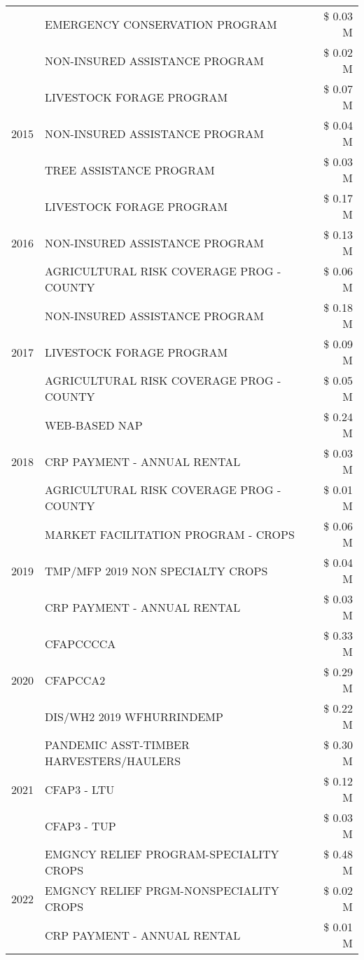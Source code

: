 \begin{tabular}{llr}
 & EMERGENCY CONSERVATION PROGRAM & \$ 0.03 M \\
 & NON-INSURED ASSISTANCE PROGRAM & \$ 0.02 M \\
\cline{1-3}
\multirow[t]{3}{*}{2015} & LIVESTOCK FORAGE PROGRAM & \$ 0.07 M \\
 & NON-INSURED ASSISTANCE PROGRAM & \$ 0.04 M \\
 & TREE ASSISTANCE PROGRAM & \$ 0.03 M \\
\cline{1-3}
\multirow[t]{3}{*}{2016} & LIVESTOCK FORAGE PROGRAM & \$ 0.17 M \\
 & NON-INSURED ASSISTANCE PROGRAM & \$ 0.13 M \\
 & AGRICULTURAL RISK COVERAGE PROG - COUNTY & \$ 0.06 M \\
\cline{1-3}
\multirow[t]{3}{*}{2017} & NON-INSURED ASSISTANCE PROGRAM & \$ 0.18 M \\
 & LIVESTOCK FORAGE PROGRAM & \$ 0.09 M \\
 & AGRICULTURAL RISK COVERAGE PROG - COUNTY & \$ 0.05 M \\
\cline{1-3}
\multirow[t]{3}{*}{2018} & WEB-BASED NAP & \$ 0.24 M \\
 & CRP PAYMENT - ANNUAL RENTAL & \$ 0.03 M \\
 & AGRICULTURAL RISK COVERAGE PROG - COUNTY & \$ 0.01 M \\
\cline{1-3}
\multirow[t]{3}{*}{2019} & MARKET FACILITATION PROGRAM - CROPS & \$ 0.06 M \\
 & TMP/MFP 2019 NON SPECIALTY CROPS & \$ 0.04 M \\
 & CRP PAYMENT - ANNUAL RENTAL & \$ 0.03 M \\
\cline{1-3}
\multirow[t]{3}{*}{2020} & CFAPCCCCA & \$ 0.33 M \\
 & CFAPCCA2 & \$ 0.29 M \\
 & DIS/WH2 2019 WFHURRINDEMP & \$ 0.22 M \\
\cline{1-3}
\multirow[t]{3}{*}{2021} & PANDEMIC ASST-TIMBER HARVESTERS/HAULERS & \$ 0.30 M \\
 & CFAP3 - LTU & \$ 0.12 M \\
 & CFAP3 - TUP & \$ 0.03 M \\
\cline{1-3}
\multirow[t]{3}{*}{2022} & EMGNCY RELIEF PROGRAM-SPECIALITY CROPS & \$ 0.48 M \\
 & EMGNCY RELIEF PRGM-NONSPECIALITY CROPS & \$ 0.02 M \\
 & CRP PAYMENT - ANNUAL RENTAL & \$ 0.01 M \\
\cline{1-3}
\bottomrule
\end{tabular}
